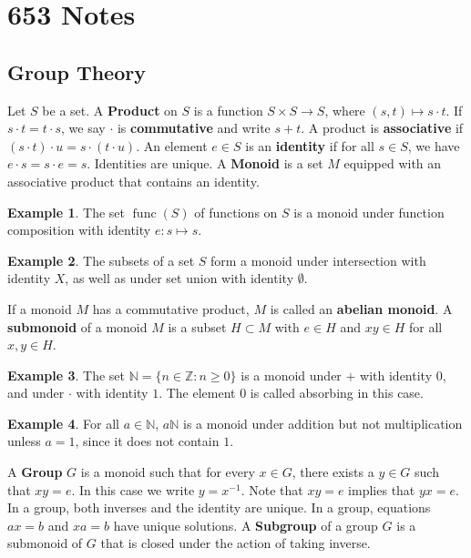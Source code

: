 \documentclass[12pt, reqno]{article}
\theoremstyle{plain}
\theoremstyle{definition}
\newtheorem*{example}{Example}
\begin{document}
\topmargin=-40pt
\renewcommand{\headrulewidth}{1pt}
\renewcommand{\headsep}{20pt}
\thispagestyle{fancy}

\section*{653 Notes}

\subsection{Group Theory}

Let $S$ be a set. A \textbf{Product} on $S$ is a function $S\times S \rightarrow S$,
where $(s,t) \mapsto s\cdot t$. 
If $s\cdot t = t \cdot s$, we say $\cdot$ is \textbf{commutative} and write $s + t$. 
A product is \textbf{associative} if $(s\cdot t)\cdot u = s \cdot (t \cdot u)$.
An element $e \in S$ is an \textbf{identity} if for all $s \in S$, we have $e\cdot s = s \cdot e = s$.
Identities are unique. 
A \textbf{Monoid} is a set $M$ equipped with an associative product that contains an identity.
\begin{example} 
    The set $\operatorname{func}(S)$ of functions on $S$ is a monoid under function 
    composition with identity $e: s \mapsto s$.
\end{example}

\begin{example}
    The subsets of a set $S$ form a monoid under intersection with identity $X$,
    as well as under set union with identity $\emptyset$.
\end{example}

If a monoid $M$ has a commutative product, $M$ is called an \textbf{abelian monoid}. A \textbf{submonoid} of a
monoid $M$ is a subset $H \subset M$ with $e \in H$ and $xy \in H$ for all $x, y \in H$. 

\begin{example}
    The set $\mathbb{N} = \{n \in \mathbb{Z}: n \geq 0\}$ is a monoid under $+$ with identity $0$, and under 
    $\cdot$ with identity $1$. The element $0$ is called absorbing in this case.
\end{example}

\begin{example}
    For all $a \in \mathbb{N}$, $a\mathbb{N}$ is a monoid under addition but not multiplication unless $a = 1$, 
    since it does not contain $1$. 
\end{example}

A \textbf{Group} $G$ is a monoid such that for every $x \in G$, there exists a $y \in G$ such that $xy = e$. In this case
we write $y = x^{-1}$. Note that $xy = e$ implies that $yx = e$. In a group, both inverses and the identity are unique.
In a group, equations $ax = b$ and $xa = b$ have unique solutions. A \textbf{Subgroup} of a group $G$ is a submonoid
of $G$ that is closed under the action of taking inverse.
\end{document}
